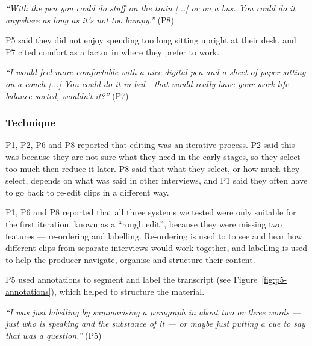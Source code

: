 \textit{``With the pen you could do stuff on the train [...]
or on a bus. You could do it anywhere as long as it's not too bumpy.''} (P8)

P5 said they did not enjoy spending too long sitting upright at their
desk, and P7 cited comfort as a factor in where they prefer to work.

\textit{``I would feel more comfortable with a nice digital pen and a sheet of paper sitting on a couch [...]
  You could do it in bed - that would really have your work-life balance sorted, wouldn't it?''} (P7)

\subsubsection{Technique}
P1, P2, P6 and P8 reported that editing was an iterative process. P2 said this was because they are not sure what they
need in the early stages, so they select too much then reduce it later. P8 said that what they select, or how much they
select, depends on what was said in other interviews, and P1 said they often have to go back to re-edit clips in a
different way. 





P1, P6 and P8 reported that all three systems we tested were only suitable for the first iteration, known as a ``rough
edit'', because they were missing two features --- re-ordering and labelling. Re-ordering is used to to see and hear how
different clips from separate interviews would work together, and labelling is used to help the producer navigate,
organise and structure their content. 




P5 used annotations to segment and label the transcript (see Figure~\ref{fig:p5-annotations}), which helped to
structure the material.

\textit{``I was just labelling by summarising a paragraph in about two or three words --- just who is speaking and the
substance of it --- or maybe just putting a cue to say that was a question.''} (P5) 


